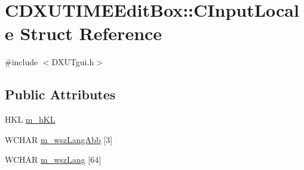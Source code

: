 \hypertarget{struct_c_d_x_u_t_i_m_e_edit_box_1_1_c_input_locale}{
\section{CDXUTIMEEditBox::CInputLocale Struct Reference}
\label{struct_c_d_x_u_t_i_m_e_edit_box_1_1_c_input_locale}
}


{\ttfamily \#include $<$DXUTgui.h$>$}\subsection*{Public Attributes}
\begin{DoxyCompactItemize}
\item 
HKL \hyperlink{struct_c_d_x_u_t_i_m_e_edit_box_1_1_c_input_locale_a1198fa91816b1e3063e53dd28e47b4f3}{m\_\-hKL}
\item 
WCHAR \hyperlink{struct_c_d_x_u_t_i_m_e_edit_box_1_1_c_input_locale_a4ca3b1bba47a1b44a2acd97d91571b68}{m\_\-wszLangAbb} \mbox{[}3\mbox{]}
\item 
WCHAR \hyperlink{struct_c_d_x_u_t_i_m_e_edit_box_1_1_c_input_locale_ab1cd17da146cda609287fd362873df13}{m\_\-wszLang} \mbox{[}64\mbox{]}
\end{DoxyCompactItemize}


